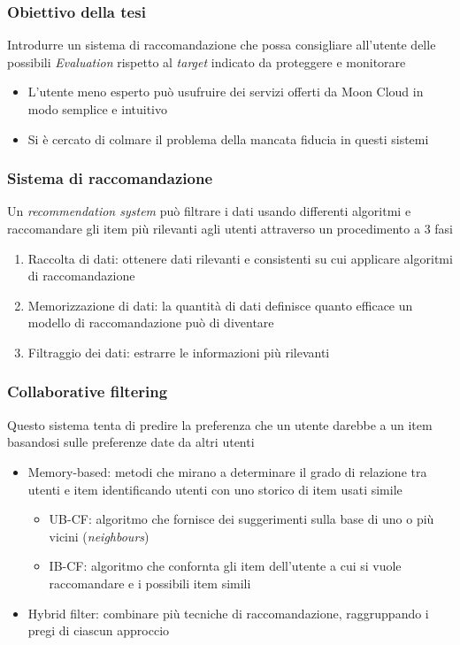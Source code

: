 \begin{frame}
    \frametitle{Obiettivo della tesi}
    Introdurre un \alert{sistema di raccomandazione} che possa consigliare all'utente delle possibili \textit{Evaluation} rispetto 
    al \textit{target} indicato da proteggere e monitorare
    \begin{itemize}
        \item L'utente meno esperto può usufruire dei servizi offerti da Moon Cloud in modo \alert{semplice} e \alert{intuitivo}
        \item Si è cercato di colmare il problema della mancata fiducia in questi sistemi
    \end{itemize}
\end{frame}

\begin{frame}
    \frametitle{Sistema di raccomandazione}
    Un \textit{recommendation system} può filtrare i dati usando differenti algoritmi e raccomandare gli item più rilevanti agli utenti attraverso 
    un procedimento a 3 fasi
    \begin{enumerate}
        \item \alert{Raccolta di dati}: ottenere dati rilevanti e consistenti su cui applicare algoritmi di raccomandazione
        \item \alert{Memorizzazione di dati}: la quantità di dati definisce quanto efficace un modello di raccomandazione può di diventare
        \item \alert{Filtraggio dei dati}: estrarre le informazioni più rilevanti
    \end{enumerate}
\end{frame}

\begin{frame}
    \frametitle{Collaborative filtering}
    Questo sistema tenta di predire la preferenza che un utente darebbe a un item basandosi sulle preferenze date da altri 
    utenti%
    \begin{itemize}
        \item Memory-based: metodi che mirano a determinare il grado di relazione tra utenti e item identificando 
        utenti con uno storico di item usati simile
            \begin{itemize}
                \item \alert{UB-CF}: algoritmo che fornisce dei suggerimenti sulla base di uno o più vicini (\textit{neighbours})
                \item \alert{IB-CF}: algoritmo che confornta gli item dell'utente a cui si vuole raccomandare e i possibili item simili
            \end{itemize}
        \item Hybrid filter: combinare più tecniche di raccomandazione, raggruppando i pregi di ciascun approccio
    \end{itemize}
\end{frame}

